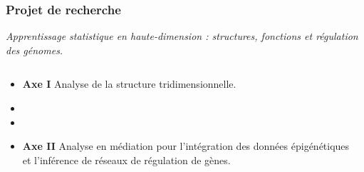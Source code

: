\documentclass[11pt,xcolor=dvipsnames]{beamer}
\begin{document}
\begin{frame}
\frametitle{Projet de recherche}
\vspace{-2em}
\begin{center}
\em
\color{red}
Apprentissage statistique en haute-dimension : structures, fonctions et
régulation des génomes.
\end{center}

\begin{overlayarea}{12cm}{5cm}
\small
{}


\begin{columns}
\begin{column}{0.7\linewidth}
\begin{itemize}[leftmargin=*]
\footnotesize
\item<4-> {\bf Axe I} \quad Analyse de la structure tridimensionnelle.
\item<4->
\item<4->
\item<5-> {\bf Axe II} \quad Analyse en médiation pour l'intégration des
données épigénétiques et
l'inférence de réseaux de régulation de gènes.
\end{itemize}
\end{column}
\begin{column}{0.3\linewidth}
\begin{overlayarea}{0.9\linewidth}{2cm}
\end{overlayarea}
\end{column}
\end{columns}
\end{overlayarea}
\end{frame}
\end{document}
